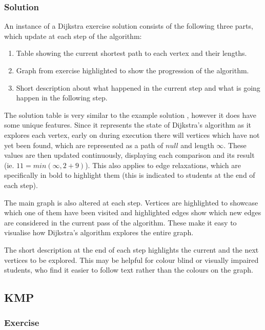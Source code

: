\documentclass{l4proj}
\begin{document}
\subsubsection{Solution}

An instance of a Dijkstra exercise solution consists of the following three parts, which update at each step of the algorithm:

\begin{enumerate}
	\item
	Table showing the current shortest path to each vertex and their lengths.
	\item
	Graph from exercise highlighted to show the progression of the algorithm.
	\item
	Short description about what happened in the current step and what is going happen in the following step.
\end{enumerate}

The solution table is very similar to the example solution \cite{a}, however it does have some unique features. Since it represents the state of Dijkstra's algorithm as it explores each vertex, early on during execution there will vertices which have not yet been found, which are represented as a path of $null$ and length $\infty$. These values are then updated continuously, displaying each comparison and its result (ie. $11 = min(\infty, 2+9)$). This also applies to edge relaxations, which are specifically in bold to highlight them (this is indicated to students at the end of each step).

The main graph is also altered at each step. Vertices are highlighted to showcase which one of them have been visited and highlighted edges show which new edges are considered in the current pass of the algorithm. These make it easy to visualise how Dijkstra's algorithm explores the entire graph.

The short description at the end of each step highlights the current and the next vertices to be explored. This may be helpful for colour blind or visually impaired students, who find it easier to follow text rather than the colours on the graph.

\subsection{KMP}

\subsubsection{Exercise}
\end{document}
